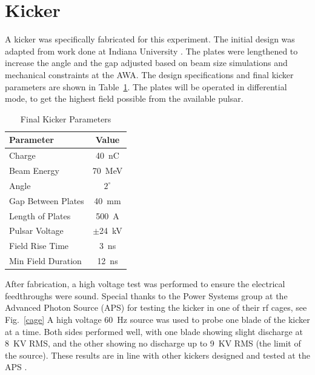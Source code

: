 \documentclass[letterpaper,  %
              ]{jacow-2_3}   %
\begin{document}
\section{Kicker}
A kicker was specifically fabricated 
for this experiment. The initial design was adapted from 
work done at Indiana University \cite{kicker,korea}. The plates were lengthened
to increase the angle and the gap adjusted based on 
beam size simulations and mechanical constraints at the AWA. 
The design specifications and final kicker parameters 
are shown in Table~\ref{tkick}. The plates will be 
operated in differential mode, to get the highest field
possible from the available pulsar.
\begin{table}[hbt]
	\centering
	\caption{Final Kicker Parameters}
	\begin{tabular}{lc}
		\toprule
		\textbf{Parameter} & \textbf{Value} \\
		\midrule
		Charge       		& \SI{40}{nC}   \\ %
		Beam Energy  		& \SI{70}{MeV}  \\ %
		Angle 	     		& $2^{\circ}$ 	\\
		Gap Between Plates  & \SI{40}{mm}	\\		 
		Length of Plates    & \SI{500}{A}	\\
		Pulsar Voltage      & $\pm$\SI{24}{kV} \\
		Field Rise Time  	& \SI{3}{ns}    \\
		Min Field Duration 	& \SI{12}{ns}  \\ %
		\bottomrule
	\end{tabular}
	\label{tkick}
\end{table}

After fabrication, a high voltage test was performed to ensure 
the electrical feedthroughs were sound. Special thanks to 
the Power Systems group at the Advanced Photon Source (APS) for testing 
the kicker in one of their rf cages, see Fig.~\ref{cage}
A high voltage \SI{60}{Hz} 
source was used to probe one blade of the kicker at a time. 
Both sides performed well, with one blade showing slight discharge
at \SI{8}{KV} RMS, and the other showing no discharge up to \SI{9}{KV} RMS
(the limit of the source). These results are in line with other kickers
designed and tested at the APS \cite{mbakicker}.  
\end{document}
